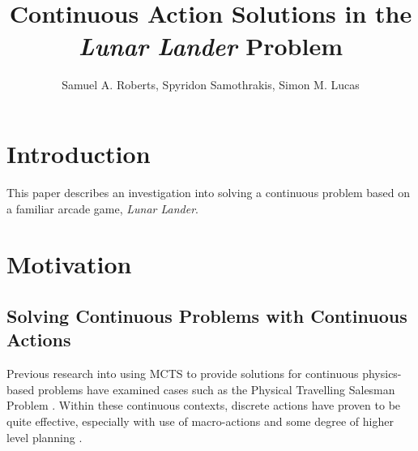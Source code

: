 \documentclass[conference]{IEEEtran}
\begin{document}
\title{\ \\ \LARGE\bf Continuous Action Solutions in the {\itshape Lunar Lander} Problem } 

\author{Samuel A. Roberts, Spyridon Samothrakis, Simon M. Lucas}


\maketitle


\begin{abstract}


\end{abstract}





\section{Introduction}

This paper describes an investigation into solving a continuous problem based on a familiar arcade game, {\itshape Lunar Lander}.


\section{Motivation}



\subsection{Solving Continuous Problems with Continuous Actions} %

Previous research into using MCTS to provide solutions for continuous physics-based problems have examined cases such as the Physical Travelling Salesman Problem \cite{perez14}. Within these continuous contexts, discrete actions have proven to be quite effective, especially with use of macro-actions and some degree of higher level planning \cite{powley12}.  %
\end{document}
